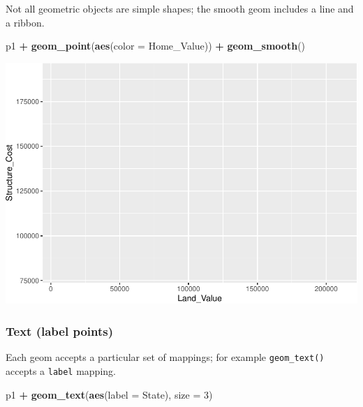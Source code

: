\documentclass[
]{book}
\newenvironment{Shaded}{\begin{snugshade}}{\end{snugshade}}
\newcommand{\DataTypeTok}[1]{\textcolor[rgb]{0.13,0.29,0.53}{#1}}
\newcommand{\DecValTok}[1]{\textcolor[rgb]{0.00,0.00,0.81}{#1}}
\newcommand{\KeywordTok}[1]{\textcolor[rgb]{0.13,0.29,0.53}{\textbf{#1}}}
\newcommand{\NormalTok}[1]{#1}
\newcommand{\OperatorTok}[1]{\textcolor[rgb]{0.81,0.36,0.00}{\textbf{#1}}}
\newcommand{\StringTok}[1]{\textcolor[rgb]{0.31,0.60,0.02}{#1}}
\begin{document}
Not all geometric objects are simple shapes; the smooth geom includes a line and a ribbon.

\begin{Shaded}
\begin{Highlighting}[]
\NormalTok{p1 }\OperatorTok{+}
\StringTok{  }\KeywordTok{geom\_point}\NormalTok{(}\KeywordTok{aes}\NormalTok{(}\DataTypeTok{color =}\NormalTok{ Home\_Value)) }\OperatorTok{+}
\StringTok{  }\KeywordTok{geom\_smooth}\NormalTok{()}
\end{Highlighting}
\end{Shaded}

\includegraphics{R/Rgraphics/figures/unnamed-chunk-146-1.pdf}

\hypertarget{text-label-points}{%
\subsubsection{Text (label points)}\label{text-label-points}}

Each geom accepts a particular set of mappings; for example \texttt{geom\_text()} accepts a \texttt{label} mapping.

\begin{Shaded}
\begin{Highlighting}[]
\NormalTok{p1 }\OperatorTok{+}\StringTok{ }
\StringTok{  }\KeywordTok{geom\_text}\NormalTok{(}\KeywordTok{aes}\NormalTok{(}\DataTypeTok{label =}\NormalTok{ State), }\DataTypeTok{size =} \DecValTok{3}\NormalTok{)}
\end{Highlighting}
\end{Shaded}
\end{document}
